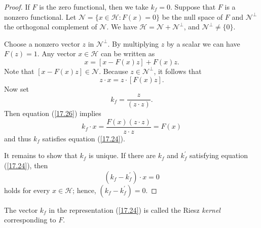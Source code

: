 \documentclass[\topdir/lecture\_notes.tex]{subfiles}
\begin{document}
\begin{proof}
If $F$ is the zero functional, then we take $k_{f}=0$. Suppose that $F$ is a nonzero functional. Let $\mathcal{N}=\{x \in \mathcal{H}: F(x)=0\}$ be the null space of $F$ and $\mathcal{N}^{\perp}$ the orthogonal complement of $\mathcal{N}$. We have $\mathcal{H}=\mathcal{N}+\mathcal{N}^{\perp}$, and $\mathcal{N}^{\perp} \neq\{0\}$.

Choose a nonzero vector $z$ in $\mathcal{N}^{\perp}$. By multiplying $z$ by a scalar we can have $F(z)=1$. Any vector $x \in \mathcal{H}$ can be written as
\begin{equation*}
x=[x-F(x) z]+F(x) z. 
\end{equation*}
Note that $[x-F(x) z] \in \mathcal{N}$. Because $z \in \mathcal{N}^{\perp}$, it follows that
\begin{equation}
z \cdot x=z \cdot[F(x) z]. \label{17.26}
\end{equation}
Now set
\begin{equation*}
k_{f}=\frac{z}{(z \cdot z)} . 
\end{equation*}
Then equation (\ref{17.26}) implies
\begin{equation*}
k_{f} \cdot x=\frac{F(x)(z \cdot z)}{z \cdot z}=F(x) 
\end{equation*}
and thus $k_{f}$ satisfies equation (\ref{17.24}).

It remains to show that $k_{f}$ is unique. If there are $k_{f}$ and $k_{f}^{\prime}$ satisfying equation (\ref{17.24}), then
\begin{equation*}
\left(k_{f}-k_{f}^{\prime}\right) \cdot x=0 
\end{equation*}
holds for every $x \in \mathcal{H}$; hence, $\left(k_{f}-k_{f}^{\prime}\right)=0$.
\end{proof}
The vector $k_{f}$ in the representation (\ref{17.24}) is called the Riesz \emph{kernel} corresponding to $F$.
\end{document}
